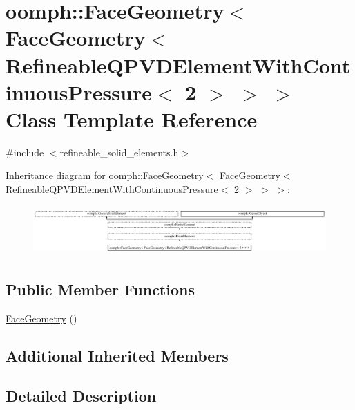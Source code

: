 \hypertarget{classoomph_1_1FaceGeometry_3_01FaceGeometry_3_01RefineableQPVDElementWithContinuousPressure_3_012_01_4_01_4_01_4}{}\section{oomph\+:\+:Face\+Geometry$<$ Face\+Geometry$<$ Refineable\+Q\+P\+V\+D\+Element\+With\+Continuous\+Pressure$<$ 2 $>$ $>$ $>$ Class Template Reference}
\label{classoomph_1_1FaceGeometry_3_01FaceGeometry_3_01RefineableQPVDElementWithContinuousPressure_3_012_01_4_01_4_01_4}


{\ttfamily \#include $<$refineable\+\_\+solid\+\_\+elements.\+h$>$}

Inheritance diagram for oomph\+:\+:Face\+Geometry$<$ Face\+Geometry$<$ Refineable\+Q\+P\+V\+D\+Element\+With\+Continuous\+Pressure$<$ 2 $>$ $>$ $>$\+:\begin{figure}[H]
\begin{center}
\leavevmode
\includegraphics[height=1.911263cm]{classoomph_1_1FaceGeometry_3_01FaceGeometry_3_01RefineableQPVDElementWithContinuousPressure_3_012_01_4_01_4_01_4}
\end{center}
\end{figure}
\subsection*{Public Member Functions}
\begin{DoxyCompactItemize}
\item 
\hyperlink{classoomph_1_1FaceGeometry_3_01FaceGeometry_3_01RefineableQPVDElementWithContinuousPressure_3_012_01_4_01_4_01_4_a0b513bcd160343b52ce7daf71c87287b}{Face\+Geometry} ()
\end{DoxyCompactItemize}
\subsection*{Additional Inherited Members}


\subsection{Detailed Description}
